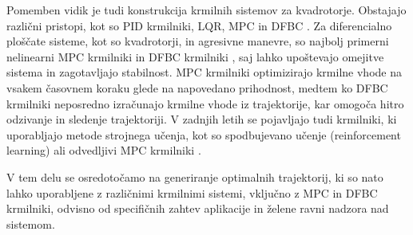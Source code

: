 \documentclass[isrm2, tisk]{fmfdelo}
\begin{document}
Pomemben vidik je tudi konstrukcija krmilnih sistemov za kvadrotorje. Obstajajo različni pristopi, kot so \ac{PID} krmilniki, \ac{LQR}, \acs{MPC} in \acs{DFBC} \cite{lee2010geometric}. Za diferencialno ploščate sisteme, kot so kvadrotorji, in agresivne manevre, so najbolj primerni nelinearni \ac{MPC} krmilniki in \ac{DFBC} krmilniki \cite{sun2022comparative}, saj lahko upoštevajo omejitve sistema in zagotavljajo stabilnost. \ac{MPC} krmilniki optimizirajo krmilne vhode na vsakem časovnem koraku glede na napovedano prihodnost, medtem ko \ac{DFBC} krmilniki neposredno izračunajo krmilne vhode iz trajektorije, kar omogoča hitro odzivanje in sledenje trajektoriji. V zadnjih letih se pojavljajo tudi krmilniki, ki uporabljajo metode strojnega učenja, kot so spodbujevano učenje (reinforcement learning) \cite{hwangbo2017control} ali odvedljivi \ac{MPC} krmilniki \cite{amos2018differentiable}.

V tem delu se osredotočamo na generiranje optimalnih trajektorij, ki so nato lahko uporabljene z različnimi krmilnimi sistemi, vključno z \ac{MPC} in \ac{DFBC} krmilniki, odvisno od specifičnih zahtev aplikacije in želene ravni nadzora nad sistemom.

\end{document}
